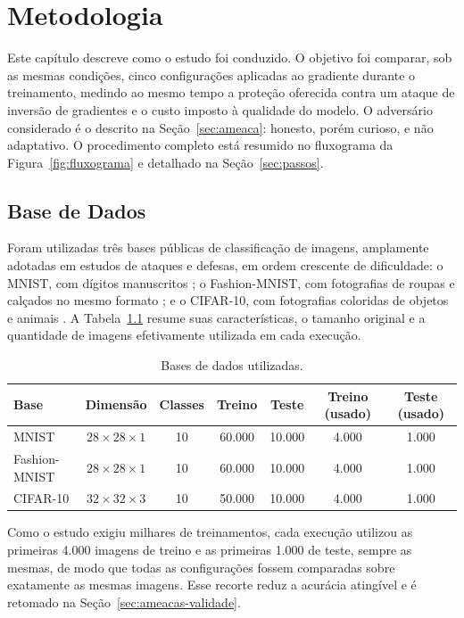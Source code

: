 \chapter{Metodologia} \label{desenvolvimento}

Este capítulo descreve como o estudo foi conduzido. O objetivo foi comparar, sob as mesmas condições, cinco configurações aplicadas ao gradiente durante o treinamento, medindo ao mesmo tempo a proteção oferecida contra um ataque de inversão de gradientes e o custo imposto à qualidade do modelo. O adversário considerado é o descrito na Seção~\ref{sec:ameaca}: honesto, porém curioso, e não adaptativo. O procedimento completo está resumido no fluxograma da Figura~\ref{fig:fluxograma} e detalhado na Seção~\ref{sec:passos}.

\section{Base de Dados}

Foram utilizadas três bases públicas de classificação de imagens, amplamente adotadas em estudos de ataques e defesas, em ordem crescente de dificuldade: o MNIST, com dígitos manuscritos \cite{LeCun1998}; o Fashion-MNIST, com fotografias de roupas e calçados no mesmo formato \cite{Xiao2017}; e o CIFAR-10, com fotografias coloridas de objetos e animais \cite{Krizhevsky2009}. A Tabela~\ref{tab:datasets} resume suas características, o tamanho original e a quantidade de imagens efetivamente utilizada em cada execução.

\begin{table}[htb]
\centering
\caption{Bases de dados utilizadas.}
\label{tab:datasets}
\begin{tabular}{lcccccc}
\toprule
Base & Dimensão & Classes & Treino & Teste & Treino (usado) & Teste (usado) \\
\midrule
MNIST         & $28 \times 28 \times 1$ & 10 & 60.000 & 10.000 & 4.000 & 1.000 \\
Fashion-MNIST & $28 \times 28 \times 1$ & 10 & 60.000 & 10.000 & 4.000 & 1.000 \\
CIFAR-10      & $32 \times 32 \times 3$ & 10 & 50.000 & 10.000 & 4.000 & 1.000 \\
\bottomrule
\end{tabular}
\end{table}

Como o estudo exigiu milhares de treinamentos, cada execução utilizou as primeiras 4.000 imagens de treino e as primeiras 1.000 de teste, sempre as mesmas, de modo que todas as configurações fossem comparadas sobre exatamente as mesmas imagens. Esse recorte reduz a acurácia atingível e é retomado na Seção~\ref{sec:ameacas-validade}.

